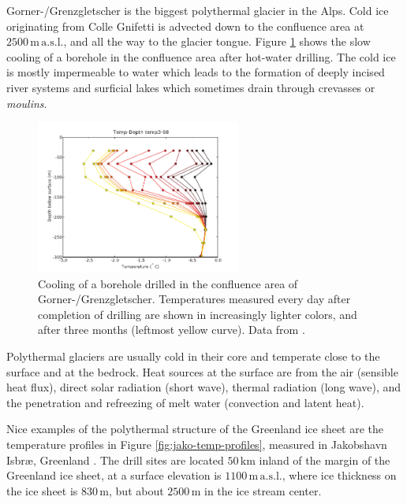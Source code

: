 \documentclass[parskip=half]{scrartcl}
\newcommand{\unit}[1]{\ensuremath{\,\mathrm{#1}}}
\begin{document}
Gorner-/Grenzgletscher is the biggest polythermal glacier in the Alps.
Cold ice originating from Colle Gnifetti is advected down to the
confluence area at $2500\unit{m}\unit{a.s.l.}$, and all the way to the
glacier tongue.  Figure \ref{fig:temp-profile-gorner} shows the slow
cooling of a borehole in the confluence area after hot-water drilling.
The cold ice is mostly impermeable to water which leads to the
formation of deeply incised river systems and surficial lakes which
sometimes drain through crevasses or \emph{moulins}.


\begin{figure}[tbhp] \centering
 \includegraphics[width=0.6\textwidth]{figures/gorner-temp-depth_temp3-08}
 \caption{Cooling of a borehole drilled in the confluence area of
Gorner-/Grenzgletscher. Temperatures measured every day after
completion of drilling are shown in increasingly lighter colors, and
after three months (leftmost yellow curve). Data from
\cite{Ryser2009}.
   \label{fig:temp-profile-gorner}}
\end{figure}

Polythermal glaciers are usually cold in their core and temperate
close to the surface and at the bedrock.  Heat sources at the surface
are from the air (sensible heat flux), direct solar radiation (short
wave), thermal radiation (long wave), and the penetration and
refreezing of melt water (convection and latent heat).

Nice examples of the polythermal structure of the Greenland ice sheet
are the temperature profiles in Figure \ref{fig:jako-temp-profiles},
measured in Jakobshavn Isbr\ae{}, Greenland
\citep{IkenEchelmeyer1993,Funk1994a,Luethi2002}.  The drill sites are
located $50\unit{km}$ inland of the margin of the Greenland ice sheet,
at a surface elevation is $1100\unit{m} \unit{a.s.l.}$, where ice
thickness on the ice sheet is $830\unit{m}$, but about $2500\unit{m}$
in the ice stream center.
\end{document}
